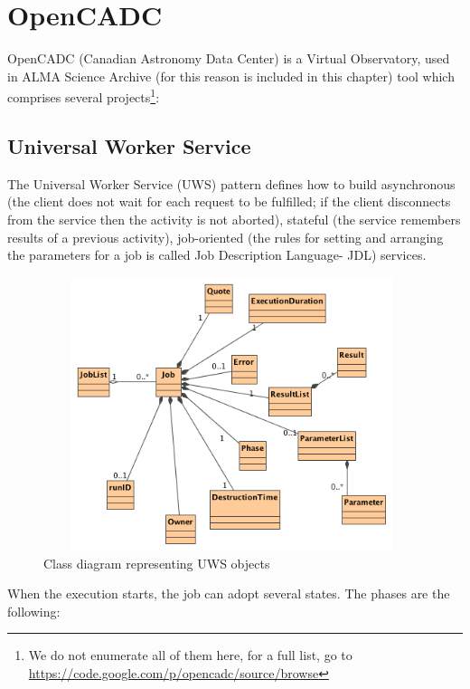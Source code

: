 \section{OpenCADC}\label{opencadc}

OpenCADC (Canadian Astronomy Data Center) is a Virtual Observatory, used in ALMA Science Archive (for this reason is included in this chapter) tool which comprises several projects\footnote{We do not enumerate all of them here, for a full list, go to \url{https://code.google.com/p/opencadc/source/browse}}:

\subsection{Universal Worker Service}

The Universal Worker Service (UWS) pattern defines how to build asynchronous (the client does not wait for each request to be fulfilled; if the client disconnects from the service then the activity is not aborted), stateful (the service remembers results of a previous activity), job-oriented (the rules for setting and arranging the parameters for a job is called Job Description Language- JDL) services.

\begin{figure}[tb]
\centering
\includegraphics[width=11cm,height=8cm]{images/Class_Diagram__UWS__UWSObjects.png}
\caption{Class diagram representing UWS objects}
\end{figure}

When the execution starts, the job can adopt several states. The phases are the following:



